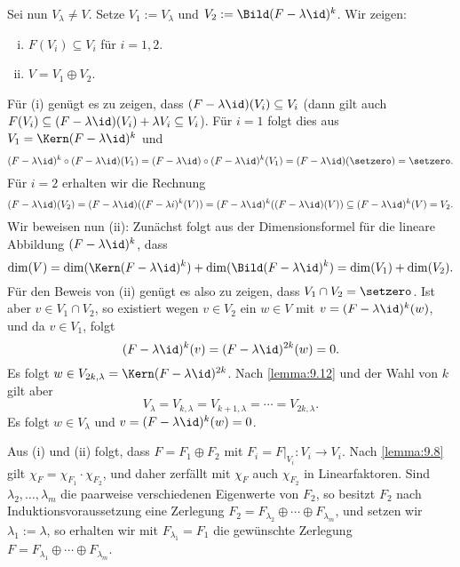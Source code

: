 \begin{beweis}
	Sei nun $V_\lambda \neq V$.
	Setze $V_1 := V_\lambda$ und $V_2 := \Bild(F - \lambda \id)^k$.
	Wir zeigen:
	\begin{enumerate}[(i)]
		\item $F(V_i) \subseteq V_i$ für $i = 1,2$.
		\item $V = V_1 \oplus V_2$.
	\end{enumerate}
	Für (i) genügt es zu zeigen, dass $(F - \lambda \id)(V_i) \subseteq V_i$ (dann gilt auch $F(V_i) \subseteq (F-\lambda \id)(V_i) + \lambda V_i \subseteq V_i$).
	Für $i = 1$ folgt dies aus $V_1 = \Kern(F - \lambda \id)^k$ und
	\[
		(F-\lambda \id)^k \circ (F-\lambda \id)(V_1) = (F - \lambda \id) \circ (F - \lambda \id)^k(V_1) = (F - \lambda \id)(\setzero) = \setzero.
	\]
	Für $i = 2$ erhalten wir die Rechnung
	\[
		(F-\lambda \id)(V_2) = (F-\lambda \id)((F-\lambda i)^k(V)) = (F - \lambda \id)^k((F - \lambda \id)(V)) \subseteq (F-\lambda \id)^k(V) = V_2.
	\]
	Wir beweisen nun (ii):
	Zunächst folgt aus der Dimensionsformel für die lineare Abbildung $(F-\lambda \id)^k$, dass
	\[
		\dim(V) = \dim(\Kern(F - \lambda \id)^k) + \dim(\Bild(F - \lambda \id)^k) = \dim(V_1) + \dim(V_2).
	\]
	Für den Beweis von (ii) genügt es also zu zeigen, dass $V_1 \cap V_2 = \setzero$.
	Ist aber $v \in V_1 \cap V_2$, so existiert wegen $v \in V_2$ ein $w \in V$ mit $v = (F-\lambda \id)^k(w)$, und da $v \in V_1$, folgt
	\[
		(F- \lambda \id)^k(v) = (F - \lambda \id)^{2k}(w) = 0.
	\]
	Es folgt $w \in V_{2k,\lambda} = \Kern(F - \lambda \id)^{2k}$.
	Nach \autoref{lemma:9.12} und der Wahl von $k$ gilt aber
	\[
		V_\lambda = V_{k,\lambda} = V_{k+1,\lambda} = \cdots = V_{2k,\lambda}.
	\]
	Es folgt $w \in V_{\lambda}$ und $v = (F - \lambda \id)^{k}(w) = 0$.
	
	Aus (i) und (ii) folgt, dass $F = F_1 \oplus F_2$ mit $F_i = F\big|_{V_i} \colon V_i \rightarrow V_i$.
	Nach \autoref{lemma:9.8} gilt $\chi_F = \chi_{F_1} \cdot \chi_{F_2}$, und daher zerfällt mit $\chi_F$ auch $\chi_{F_2}$ in Linearfaktoren.
	Sind $\lambda_2,\dots,\lambda_m$ die paarweise verschiedenen Eigenwerte von $F_2$, so besitzt $F_2$ nach Induktionsvoraussetzung eine Zerlegung $F_2 = F_{\lambda_2} \oplus \cdots \oplus F_{\lambda_m}$, und setzen wir $\lambda_1 := \lambda$, so erhalten wir mit $F_{\lambda_1} = F_1$ die gewünschte Zerlegung $F = F_{\lambda_1} \oplus \cdots \oplus F_{\lambda_m}$. 
\end{beweis}

